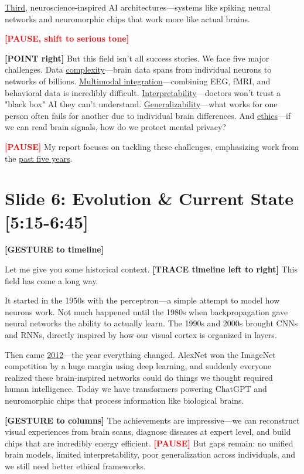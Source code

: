\documentclass[12pt]{article}
\begin{document}
\ul{Third}, neuroscience-inspired AI architectures—systems like spiking neural networks and neuromorphic chips that work more like actual brains.

\textcolor{red}{\textbf{[PAUSE, shift to serious tone]}}

\textcolor{DukeBlue}{\textbf{[POINT right]}} But this field isn't all success stories. We face five major challenges. Data \ul{complexity}—brain data spans from individual neurons to networks of billions. \ul{Multimodal integration}—combining EEG, fMRI, and behavioral data is incredibly difficult. \ul{Interpretability}—doctors won't trust a "black box" AI they can't understand. \ul{Generalizability}—what works for one person often fails for another due to individual brain differences. And \ul{ethics}—if we can read brain signals, how do we protect mental privacy?

\textcolor{red}{\textbf{[PAUSE]}} My report focuses on tackling these challenges, emphasizing work from the \ul{past five years}.

\hrulefill

\section*{Slide 6: Evolution \& Current State [5:15-6:45]}

\textcolor{DukeBlue}{\textbf{[GESTURE to timeline]}}

Let me give you some historical context. \textcolor{DukeBlue}{\textbf{[TRACE timeline left to right]}} This field has come a long way.

It started in the 1950s with the perceptron—a simple attempt to model how neurons work. Not much happened until the 1980s when backpropagation gave neural networks the ability to actually learn. The 1990s and 2000s brought CNNs and RNNs, directly inspired by how our visual cortex is organized in layers.

Then came \ul{2012}—the year everything changed. AlexNet won the ImageNet competition by a huge margin using deep learning, and suddenly everyone realized these brain-inspired networks could do things we thought required human intelligence. Today we have transformers powering ChatGPT and neuromorphic chips that process information like biological brains.

\textcolor{DukeBlue}{\textbf{[GESTURE to columns]}} The achievements are impressive—we can reconstruct visual experiences from brain scans, diagnose diseases at expert level, and build chips that are incredibly energy efficient. \textcolor{red}{\textbf{[PAUSE]}} But gaps remain: no unified brain models, limited interpretability, poor generalization across individuals, and we still need better ethical frameworks.
\end{document}

